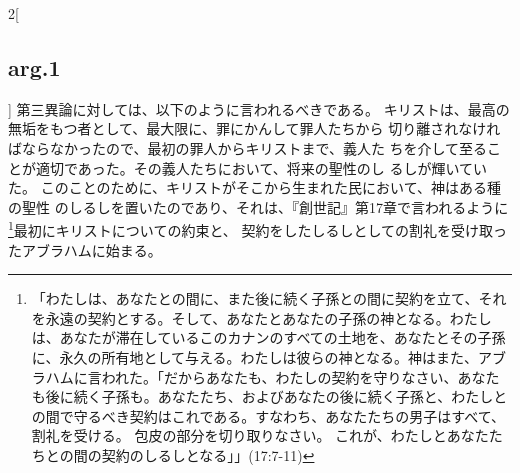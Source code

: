 \documentclass[paper=a4paper,fontsize=10pt,jafontsize=9pt,titlepage]{jlreq}
\begin{document}
\begin{paracol}{2}[\subsection{arg.1}]
第三異論に対しては、以下のように言われるべきである。
キリストは、最高の無垢をもつ者として、最大限に、罪にかんして罪人たちから
 切り離されなければならなかったので、最初の罪人からキリストまで、義人た
 ちを介して至ることが適切であった。その義人たちにおいて、将来の聖性のし
 るしが輝いていた。
このことのために、キリストがそこから生まれた民において、神はある種の聖性
 のしるしを置いたのであり、それは、『創世記』第17章で言われるように\footnote{「わたしは、あなたとの間に、また後に続く子孫との間に契約を立て、それを永遠の契約とする。そして、あなたとあなたの子孫の神となる。わたしは、あなたが滞在しているこのカナンのすべての土地を、あなたとその子孫に、永久の所有地として与える。わたしは彼らの神となる。神はまた、アブラハムに言われた。「だからあなたも、わたしの契約を守りなさい、あなたも後に続く子孫も。あなたたち、およびあなたの後に続く子孫と、わたしとの間で守るべき契約はこれである。すなわち、あなたたちの男子はすべて、割礼を受ける。
包皮の部分を切り取りなさい。
 これが、わたしとあなたたちとの間の契約のしるしとなる」」(17:7-11)}最初にキリストについての約束と、
 契約をしたしるしとしての割礼を受け取ったアブラハムに始まる。

\end{paracol}
\end{document}
